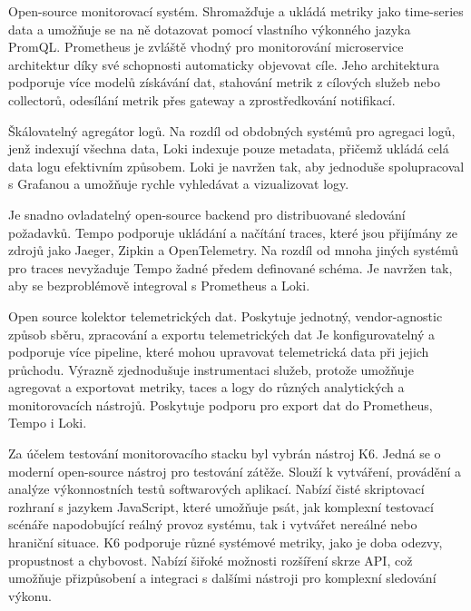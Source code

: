  
Open-source monitorovací systém. Shromažďuje a ukládá metriky jako time-series data a umožňuje se na ně dotazovat pomocí vlastního výkonného jazyka PromQL. Prometheus je zvláště vhodný pro monitorování microservice architektur díky své schopnosti automaticky objevovat cíle. Jeho architektura podporuje více modelů získávání dat, stahování metrik z cílových služeb nebo collectorů, odesílání metrik přes gateway a zprostředkování notifikací.


Škálovatelný agregátor logů. Na rozdíl od obdobných systémů pro agregaci logů, jenž indexují všechna data, Loki indexuje pouze metadata, přičemž ukládá celá data logu efektivním způsobem. Loki je navržen tak, aby jednoduše spolupracoval s Grafanou a umožňuje rychle vyhledávat a vizualizovat logy.


Je snadno ovladatelný open-source backend pro distribuované sledování požadavků. Tempo podporuje ukládání a načítání traces, které jsou přijímány ze zdrojů jako Jaeger, Zipkin a OpenTelemetry. Na rozdíl od mnoha jiných systémů pro traces nevyžaduje Tempo žadné předem definované schéma. Je navržen tak, aby se bezproblémově integroval s Prometheus a Loki.


Open source kolektor telemetrických dat. Poskytuje jednotný, vendor-agnostic způsob sběru, zpracování a exportu telemetrických dat  Je konfigurovatelný a podporuje více pipeline, které mohou upravovat telemetrická data při jejich průchodu. Výrazně zjednodušuje instrumentaci služeb, protože umožňuje agregovat a exportovat metriky, taces a logy do různých analytických a monitorovacích nástrojů. Poskytuje podporu pro export dat do Prometheus, Tempo i Loki.


Za účelem testování monitorovacího stacku byl vybrán nástroj K6. Jedná se o moderní open-source nástroj pro testování zátěže. Slouží k vytváření, provádění a analýze výkonnostních testů softwarových aplikací. Nabízí čisté skriptovací rozhraní s jazykem JavaScript, které umožňuje psát, jak komplexní testovací scénáře napodobující reálný provoz systému, tak i vytvářet nereálné nebo hraniční situace. K6 podporuje různé systémové metriky, jako je doba odezvy, propustnost a chybovost. Nabízí šiřoké možnosti rozšíření skrze API, což umožňuje přizpůsobení a integraci s dalšími nástroji pro komplexní sledování výkonu.

